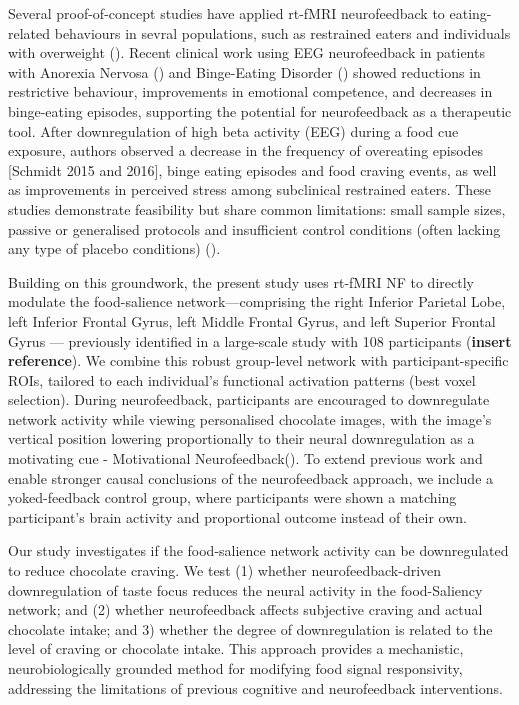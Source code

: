 \documentclass[]{imag-ms-template}
\begin{document}
Several proof-of-concept studies have applied rt-fMRI neurofeedback to eating-related behaviours in sevral populations, such as restrained eaters and individuals with overweight (\cite{schmidtNeurofeedbackReducesOvereating2015, ihssenNeurofeedbackVisualFood2017b, spetterRealtimeFMRINeurofeedback2017, blumeEEGNeurofeedbackTreatment2022}). Recent clinical work using EEG neurofeedback in patients with Anorexia Nervosa (\cite{lacknerEEGNeurofeedbackEffects2016}) and Binge-Eating Disorder (\cite{blumeEEGNeurofeedbackTreatment2022}) showed reductions in restrictive behaviour, improvements in emotional competence, and decreases in binge-eating episodes, supporting the potential for neurofeedback as a therapeutic tool.  After downregulation of high beta activity (EEG) during a food cue exposure, authors observed a decrease in the frequency of overeating episodes [Schmidt 2015 and 2016], binge eating episodes and food craving events, as well as improvements in perceived stress among subclinical restrained eaters. These studies demonstrate feasibility but share common limitations: small sample sizes, passive or generalised protocols and insufficient control conditions (often lacking any type of placebo conditions) (\cite{bartholdyPotentialNeurofeedbackTreatment2013b, imperatoriFeedbackBasedTreatmentsEating2018}). 

Building on this groundwork, the present study uses rt-fMRI NF to directly modulate the food-salience network—comprising the right Inferior Parietal Lobe, left Inferior Frontal Gyrus, left Middle Frontal Gyrus, and left Superior Frontal Gyrus — previously identified in a large-scale study with 108 participants (\textbf{insert reference}). We combine this robust group-level network with participant-specific ROIs, tailored to each individual’s functional activation patterns (best voxel selection). During neurofeedback, participants are encouraged to downregulate network activity while viewing personalised chocolate images, with the image’s vertical position lowering proportionally to their neural downregulation as a motivating cue - Motivational Neurofeedback(\cite{ihssenNeurofeedbackVisualFood2017}). To extend previous work and enable stronger causal conclusions of the neurofeedback approach, we include a yoked-feedback control group, where participants were shown a matching participant's brain activity and proportional outcome instead of their own.

Our study investigates if the food-salience network activity can be downregulated to reduce chocolate craving. We test (1) whether neurofeedback-driven downregulation of taste focus reduces the neural activity in the food-Saliency network; and (2) whether neurofeedback affects subjective craving  and actual chocolate intake; and 3) whether the degree of downregulation is related to the level of craving or chocolate intake. This approach provides a mechanistic, neurobiologically grounded method for modifying food signal responsivity, addressing the limitations of previous cognitive and neurofeedback interventions.
\end{document}
